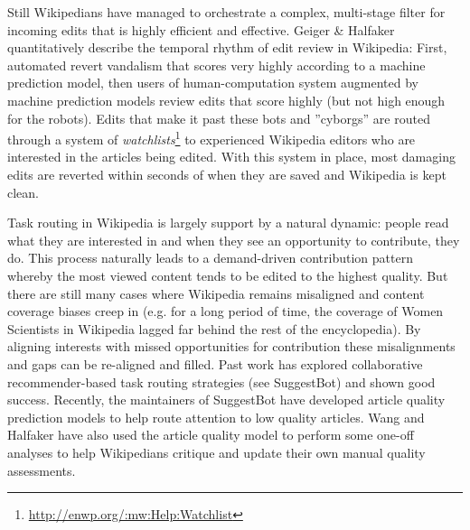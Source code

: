 Still Wikipedians have managed to orchestrate a complex, multi-stage filter for incoming edits that is highly efficient and effective.  Geiger \& Halfaker quantitatively describe the temporal rhythm of edit review in Wikipedia\cite{geiger2013levee}: First, automated revert vandalism that scores very highly according to a machine prediction model, then users of human-computation system augmented by machine prediction models review edits that score highly (but not high enough for the robots).  Edits that make it past these bots and ''cyborgs''\cite{halfaker2012bots} are routed through a system of \emph{watchlists}\footnote{\url{http://enwp.org/:mw:Help:Watchlist}} to experienced Wikipedia editors who are interested in the articles being edited.  With this system in place, most damaging edits are reverted within seconds of when they are saved\cite{geiger2013levee} and Wikipedia is kept clean.

 Task routing in Wikipedia is largely support by a natural dynamic: people read what they are interested in and when they see an opportunity to contribute, they do.  This process naturally leads to a demand-driven contribution pattern whereby the most viewed content tends to be edited to the highest quality\cite{hill2014consider}.  But there are still many cases where Wikipedia remains misaligned\cite{wang2015misalignment} and content coverage biases creep in (e.g. for a long period of time, the coverage of Women Scientists in Wikipedia lagged far behind the rest of the encyclopedia\cite{halfaker2017interpolating}).  By aligning interests with missed opportunities for contribution these misalignments and gaps can be re-aligned and filled.  Past work has explored collaborative recommender-based task routing strategies (see SuggestBot\cite{cosley2007suggestbot}) and shown good success.  Recently, the maintainers of SuggestBot have developed article quality prediction models to help route attention to low quality articles\cite{wang2013tell}.  Wang and Halfaker have also used the article quality model to perform some one-off analyses to help Wikipedians critique and update their own manual quality assessments\cite{wang2014screening}.

